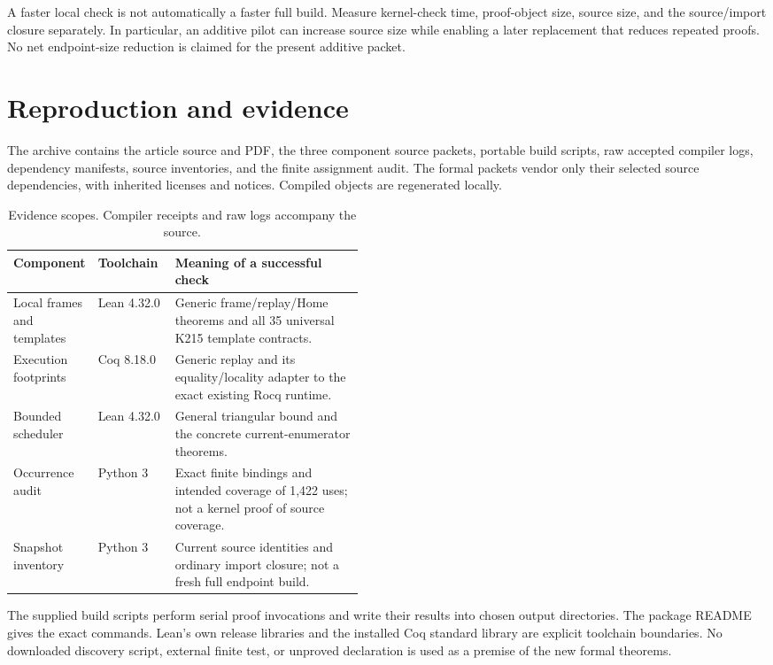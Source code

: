 \documentclass[11pt,letterpaper]{article}
\theoremstyle{definition}
\theoremstyle{remark}
\begin{document}
A faster local check is not automatically a faster full build. Measure
kernel-check time, proof-object size, source size, and the source/import
closure separately. In particular, an additive pilot can increase source
size while enabling a later replacement that reduces repeated proofs.
No net endpoint-size reduction is claimed for the present additive packet.

\section{Reproduction and evidence}

The archive contains the article source and PDF, the three component source
packets, portable build scripts, raw accepted compiler logs, dependency
manifests, source inventories, and the finite assignment audit. The formal
packets vendor only their selected source dependencies, with inherited
licenses and notices. Compiled objects are regenerated locally.

\begin{table}[ht]
\centering\small
\begin{tabularx}{\linewidth}{@{}>{\raggedright\arraybackslash}p{0.24\linewidth}>{\raggedright\arraybackslash}p{0.22\linewidth}X@{}}
\toprule
Component & Toolchain & Meaning of a successful check\\
\midrule
Local frames and templates & Lean 4.32.0 & Generic frame/replay/Home theorems and all 35 universal K215 template contracts.\\
Execution footprints & Coq 8.18.0 & Generic replay and its equality/locality adapter to the exact existing Rocq runtime.\\
Bounded scheduler & Lean 4.32.0 & General triangular bound and the concrete current-enumerator theorems.\\
Occurrence audit & Python 3 & Exact finite bindings and intended coverage of 1,422 uses; not a kernel proof of source coverage.\\
Snapshot inventory & Python 3 & Current source identities and ordinary import closure; not a fresh full endpoint build.\\
\bottomrule
\end{tabularx}
\caption{Evidence scopes. Compiler receipts and raw logs accompany the source.}
\end{table}

The supplied build scripts perform serial proof invocations and write their
results into chosen output directories. The package README gives the exact
commands. Lean's own release libraries and the installed Coq standard library
are explicit toolchain boundaries. No downloaded discovery script, external
finite test, or unproved declaration is used as a premise of the new formal
theorems.
\end{document}
